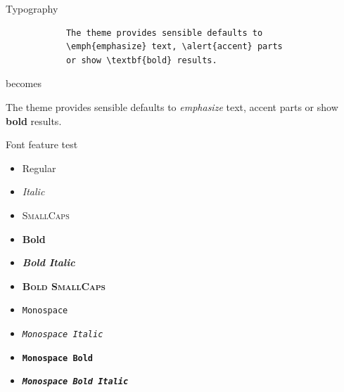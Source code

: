 \documentclass[12pt]{beamer}
\begin{document}
	\begin{frame}[fragile]{Typography}
		\begin{verbatim}
			The theme provides sensible defaults to
			\emph{emphasize} text, \alert{accent} parts
			or show \textbf{bold} results.
		\end{verbatim}
		
		\begin{center}becomes\end{center}
		
		The theme provides sensible defaults to \emph{emphasize} text,
		\alert{accent} parts or show \textbf{bold} results.
	\end{frame}
	
	\begin{frame}{Font feature test}
		\begin{itemize}
			\item Regular
			\item \textit{Italic}
			\item \textsc{SmallCaps}
			\item \textbf{Bold}
			\item \textbf{\textit{Bold Italic}}
			\item \textbf{\textsc{Bold SmallCaps}}
			\item \texttt{Monospace}
			\item \texttt{\textit{Monospace Italic}}
			\item \texttt{\textbf{Monospace Bold}}
			\item \texttt{\textbf{\textit{Monospace Bold Italic}}}
		\end{itemize}
	\end{frame}
	
\end{document}
